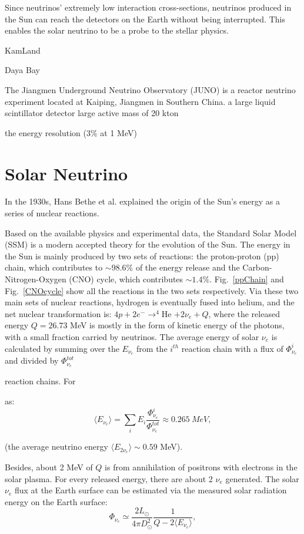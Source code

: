 Since neutrinos' extremely low interaction cross-sections, neutrinos produced in the Sun can reach the detectors on the Earth without being interrupted. This enables the solar neutrino to be a probe to the stellar physics.

KamLand

Daya Bay

The Jiangmen Underground Neutrino Observatory (JUNO) is a reactor neutrino experiment located at Kaiping, Jiangmen in Southern China. a large liquid scintillator detector 
large active mass of 20 kton

the energy resolution (3\% at 1 MeV) 
\cite{giaz2018status}

\section{Solar Neutrino}
In the 1930s, Hans Bethe et al. explained the origin of the Sun's energy as a series of nuclear reactions\cite{bethe1939energy}.

Based on the available physics and experimental data, the Standard Solar Model (SSM) is a modern accepted theory for the evolution of the Sun. The energy in the Sun is mainly produced by two sets of reactions: the proton-proton (pp) chain, which contributes to $\sim 98.6\%$ of the energy release and the Carbon-Nitrogen-Oxygen (CNO) cycle, which contributes $\sim 1.4\%$. Fig.~\ref{ppChain} and Fig.~\ref{CNOcycle} show all the reactions in the two sets respectively. Via these two main sets of nuclear reactions, hydrogen is eventually fused into helium, and the net nuclear transformation is: $4p+2e^-\to^{4}$He $+2\nu_e+Q$, where the released energy $Q=26.73$ MeV is mostly in the form of kinetic energy of the photons, with a small fraction carried by neutrinos\cite{valle2015neutrinos,antonio2018state}. The average energy of solar $\nu_e$ is calculated by summing over the $E_{\nu_e}$ from the $i^{th}$ reaction chain with a flux of $\Phi_{\nu_e}^i$ and 
divided by $\Phi^{tot}_{\nu_e}$

reaction chains. For 


 as\cite{antonio2018state}:
\begin{equation}
\langle E_{\nu_e}\rangle = \sum_i E_i \frac{\Phi^i_{\nu_e}}{\Phi^{tot}_{\nu_e}}\approx 0.265~MeV,
\end{equation}


(the average neutrino energy $\langle E_{2\nu_e} \rangle\sim 0.59$ MeV). 
 
 
 Besides, about 2 MeV of $Q$ is from annihilation of positrons with electrons in the solar plasma\cite{valle2015neutrinos,antonio2018state}. For every released energy, there are about 2 $\nu_e$ generated. The solar $\nu_e$ flux at the Earth surface can be estimated via the measured solar radiation energy on the Earth surface:
\begin{equation}
\Phi_{\nu_e} \simeq \frac{2L_{\odot}}{4\pi D_\odot^2}\frac{1}{Q-2\langle E_{\nu_e} \rangle},
\end{equation}

